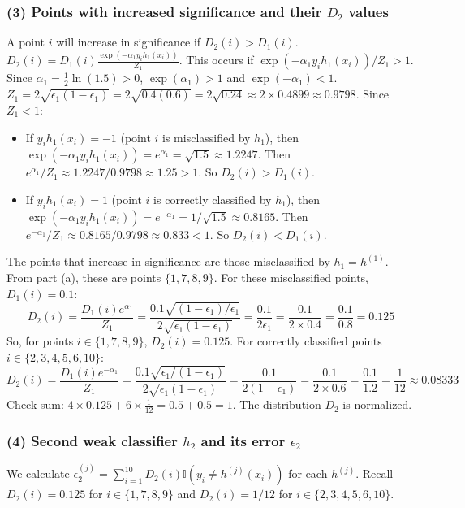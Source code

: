 \subsubsection*{(3) Points with increased significance and their $D_2$ values}
A point $i$ will increase in significance if $D_2(i) > D_1(i)$.
$D_2(i) = D_1(i) \frac{\exp(-\alpha_1 y_i h_1(x_i))}{Z_1}$.
This occurs if $\exp(-\alpha_1 y_i h_1(x_i)) / Z_1 > 1$.
Since $\alpha_1 = \frac{1}{2}\ln(1.5) > 0$, $\exp(\alpha_1) > 1$ and $\exp(-\alpha_1) < 1$.
$Z_1 = 2\sqrt{\epsilon_1(1-\epsilon_1)} = 2\sqrt{0.4(0.6)} = 2\sqrt{0.24} \approx 2 \times 0.4899 \approx 0.9798$.
Since $Z_1 < 1$:
\begin{itemize}
    \item If $y_i h_1(x_i) = -1$ (point $i$ is misclassified by $h_1$), then $\exp(-\alpha_1 y_i h_1(x_i)) = e^{\alpha_1} = \sqrt{1.5} \approx 1.2247$. Then $e^{\alpha_1}/Z_1 \approx 1.2247/0.9798 \approx 1.25 > 1$. So $D_2(i) > D_1(i)$.
    \item If $y_i h_1(x_i) = 1$ (point $i$ is correctly classified by $h_1$), then $\exp(-\alpha_1 y_i h_1(x_i)) = e^{-\alpha_1} = 1/\sqrt{1.5} \approx 0.8165$. Then $e^{-\alpha_1}/Z_1 \approx 0.8165/0.9798 \approx 0.833 < 1$. So $D_2(i) < D_1(i)$.
\end{itemize}
The points that increase in significance are those misclassified by $h_1 = h^{(1)}$. From part (a), these are points $\{1, 7, 8, 9\}$.
For these misclassified points, $D_1(i) = 0.1$:
$$ D_2(i) = \frac{D_1(i) e^{\alpha_1}}{Z_1} = \frac{0.1 \sqrt{(1-\epsilon_1)/\epsilon_1}}{2\sqrt{\epsilon_1(1-\epsilon_1)}} = \frac{0.1}{2\epsilon_1} = \frac{0.1}{2 \times 0.4} = \frac{0.1}{0.8} = 0.125 $$
So, for points $i \in \{1, 7, 8, 9\}$, $D_2(i) = 0.125$.
For correctly classified points $i \in \{2, 3, 4, 5, 6, 10\}$:
$$ D_2(i) = \frac{D_1(i) e^{-\alpha_1}}{Z_1} = \frac{0.1 \sqrt{\epsilon_1/(1-\epsilon_1)}}{2\sqrt{\epsilon_1(1-\epsilon_1)}} = \frac{0.1}{2(1-\epsilon_1)} = \frac{0.1}{2 \times 0.6} = \frac{0.1}{1.2} = \frac{1}{12} \approx 0.08333 $$
Check sum: $4 \times 0.125 + 6 \times \frac{1}{12} = 0.5 + 0.5 = 1$. The distribution $D_2$ is normalized.

\subsubsection*{(4) Second weak classifier $h_2$ and its error $\epsilon_2$}
We calculate $\epsilon_2^{(j)} = \sum_{i=1}^{10} D_2(i) \mathbb{I}(y_i \neq h^{(j)}(x_i))$ for each $h^{(j)}$.
Recall $D_2(i)=0.125$ for $i \in \{1,7,8,9\}$ and $D_2(i)=1/12$ for $i \in \{2,3,4,5,6,10\}$.

